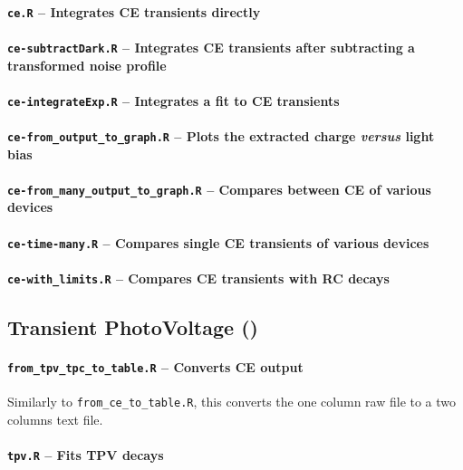 		\paragraph{\texttt{ce.R} -- Integrates CE transients directly}
		\paragraph{\texttt{ce-subtractDark.R} -- Integrates CE transients after subtracting a transformed noise profile}
		\paragraph{\texttt{ce-integrateExp.R} -- Integrates a fit to CE transients}
		\paragraph{\texttt{ce-from\_output\_to\_graph.R} -- Plots the extracted charge \textsl{versus} light bias}
		\paragraph{\texttt{ce-from\_many\_output\_to\_graph.R} -- Compares between CE of various devices}
		\paragraph{\texttt{ce-time-many.R} -- Compares single CE transients of various devices}
		\paragraph{\texttt{ce-with\_limits.R} -- Compares CE transients with RC decays}

	\subsection{Transient PhotoVoltage ()}\label{r_tpv}

		\paragraph{\texttt{from\_tpv\_tpc\_to\_table.R} -- Converts CE output}
		Similarly to \texttt{from\_ce\_to\_table.R}, this converts the one column raw file to a two columns text file.

		\paragraph{\texttt{tpv.R} -- Fits TPV decays}
		
